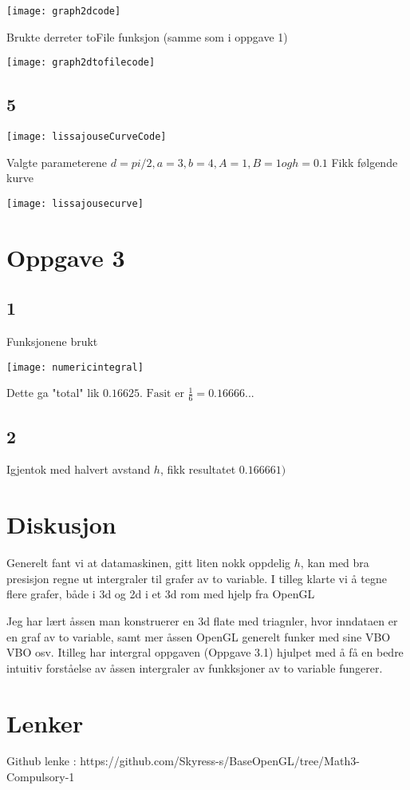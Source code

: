 ﻿\documentclass[14]{article}
\begin{document}
\begin{flushleft}
        \texttt{[image: graph2dcode]}
        
        Brukte derreter toFile funksjon (samme som i oppgave 1)
        
        \texttt{[image: graph2dtofilecode]}
        
        \subsection*{5}
        
        \texttt{[image: lissajouseCurveCode]}
        
        Valgte parameterene \(d = pi/2, a = 3, b = 4, A = 1, B = 1 og h = 0.1\) 
        Fikk følgende kurve
        
        \texttt{[image: lissajousecurve]}
        
        
        \section{Oppgave 3}
        \subsection*{1}
        Funksjonene brukt
        
        \texttt{[image: numericintegral]}
        
        Dette ga "total" lik \(0.16625 \text{. Fasit er } \frac{1}{6} = 0.16666...\) 
        
        \subsection*{2}
        
        Igjentok med halvert avstand \(h\), fikk resultatet \(0.166661)\)
        
        \section{Diskusjon}
        Generelt fant vi at datamaskinen, gitt liten nokk oppdelig \(h\), kan 
        med bra presisjon regne ut intergraler til grafer av to variable.
        I tilleg klarte vi å tegne flere grafer, både i 3d og 2d i et 3d rom med hjelp fra OpenGL
        
        Jeg har lært åssen man konstruerer en 3d flate med triagnler, hvor inndataen er en graf
        av to variable, samt mer åssen OpenGL generelt funker med sine VBO VBO osv.
        Itilleg har intergral oppgaven (Oppgave 3.1) hjulpet med å få en bedre intuitiv
        forståelse av åssen intergraler av funkksjoner av to variable fungerer.
        
        \section{Lenker}
        Github lenke : https://github.com/Skyress-s/BaseOpenGL/tree/Math3-Compulsory-1
    \end{flushleft}
\end{document}
